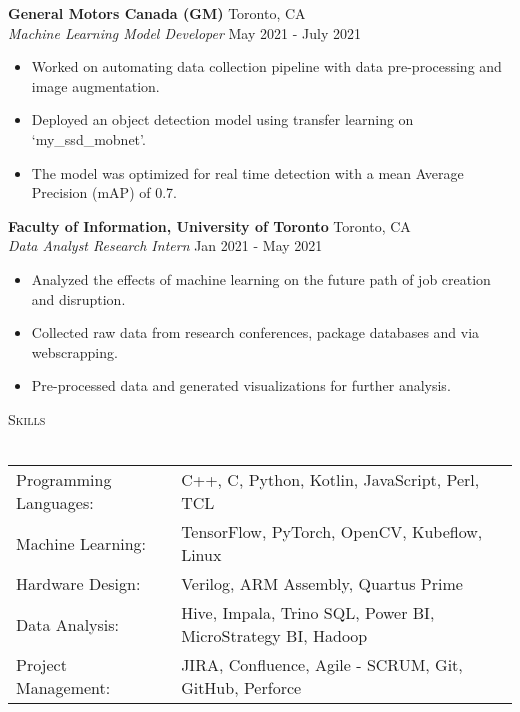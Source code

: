 \documentclass[a4paper]{article}
\newcommand{\lineunder} {
    \vspace*{-8pt} \\
    \hspace*{-18pt} \hrulefill \\
}
\newcommand{\header} [1] {
    {\hspace*{-18pt}\vspace*{6pt} \textsc{#1}}
    \vspace*{-6pt} \lineunder
}
\begin{document}
\textbf{General Motors Canada (GM)} \hfill Toronto, CA\\
\textit{Machine Learning Model Developer} \hfill May 2021 - July 2021\\
\vspace{-1mm}
\begin{itemize} \itemsep 1pt
	\item Worked on automating data collection pipeline with data pre-processing and image augmentation.
	\item Deployed an object detection model using transfer learning on ‘my\_ssd\_mobnet’.
	\item The model was optimized for real time detection with a mean Average Precision (mAP) of 0.7.
\end{itemize}

\textbf{Faculty of Information, University of Toronto} \hfill Toronto, CA\\
\textit{Data Analyst Research Intern} \hfill Jan 2021 - May 2021\\
\vspace{-1mm}
\begin{itemize} \itemsep 1pt
    \item Analyzed the effects of machine learning on the future path of job creation and disruption.
	\item Collected raw data from research conferences, package databases and via webscrapping.
    \item Pre-processed data and generated visualizations for further analysis.
\end{itemize}


\header{Skills}
\begin{tabular}{ l l }
	Programming Languages: & C++, C, Python, Kotlin, JavaScript, Perl, TCL                                 \\
	Machine Learning:      & TensorFlow, PyTorch, OpenCV, Kubeflow, Linux                          \\
    Hardware Design:       & Verilog, ARM Assembly, Quartus Prime                             \\
	Data Analysis:         & Hive, Impala, Trino SQL, Power BI, MicroStrategy BI, Hadoop \\
	Project Management:    & JIRA, Confluence, Agile - SCRUM, Git, GitHub, Perforce           \\                               
\end{tabular}
\vspace{2mm}
\end{document}
